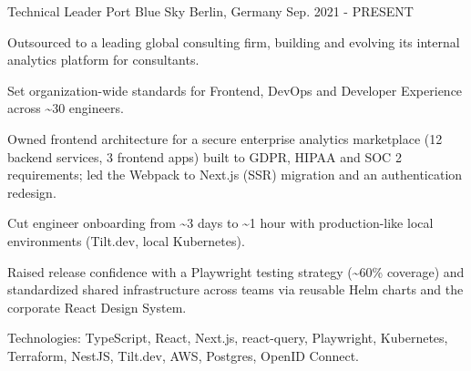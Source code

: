 

\begin{cventries}

  \cventry
    {Technical Leader} %
    {Port Blue Sky} %
    {Berlin, Germany} %
    {Sep. 2021 - PRESENT} %
    {
      \begin{cvitems} %
        \item {Outsourced to a leading global consulting firm, building and evolving its internal analytics platform for consultants.}
        \item {Set organization-wide standards for Frontend, DevOps and Developer Experience across \textasciitilde{}30 engineers.}
        \item {Owned frontend architecture for a secure enterprise analytics marketplace (12 backend services, 3 frontend apps) built to GDPR, HIPAA and SOC 2 requirements; led the Webpack to Next.js (SSR) migration and an authentication redesign.}
        \item {Cut engineer onboarding from \textasciitilde{}3 days to \textasciitilde{}1 hour with production-like local environments (Tilt.dev, local Kubernetes).}
        \item {Raised release confidence with a Playwright testing strategy (\textasciitilde{}60\% coverage) and standardized shared infrastructure across teams via reusable Helm charts and the corporate React Design System.}
        \item {Technologies: TypeScript, React, Next.js, react-query, Playwright, Kubernetes, Terraform, NestJS, Tilt.dev, AWS, Postgres, OpenID Connect.}
      \end{cvitems}
    }



\end{cventries}
